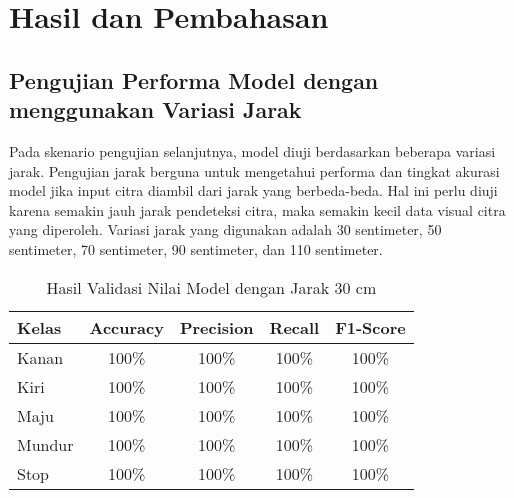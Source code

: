 \section{Hasil dan Pembahasan}
\label{sec:hasildanpembahasan}

\subsection{Pengujian Performa Model dengan menggunakan Variasi Jarak}

Pada skenario pengujian selanjutnya, model diuji berdasarkan beberapa variasi jarak. Pengujian jarak berguna untuk mengetahui performa dan tingkat akurasi model jika input citra diambil dari jarak yang berbeda-beda. Hal ini perlu diuji karena semakin jauh jarak pendeteksi citra, maka semakin kecil data visual citra yang diperoleh. Variasi jarak yang digunakan adalah 30 sentimeter, 50 sentimeter, 70 sentimeter, 90 sentimeter, dan 110 sentimeter. 

\begin{table}[ht]
  \caption{Hasil Validasi Nilai Model dengan Jarak 30 cm}
  \label{tb:30cm}
  \centering
  \begin{tabular}{|l|c|c|c|c|}
  \hline
  \rowcolor[HTML]{C0C0C0} 
  \textbf{Kelas} & \textbf{Accuracy} & \textbf{Precision} & \textbf{Recall} & \textbf{F1-Score} \\ \hline
  Kanan    & 100\%            & 100\%             & 100\%           & 100\%            \\ \hline
  Kiri     & 100\%          & 100\%           & 100\%           & 100\%           \\ \hline
  Maju      & 100\%          & 100\%           & 100\%          & 100\%          \\ \hline
  Mundur     & 100\%            & 100\%             & 100\%           & 100\%            \\ \hline
  Stop  & 100\%            & 100\%             & 100\%           & 100\%            \\ \hline
  \end{tabular}
\end{table}

